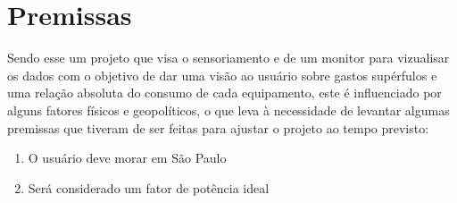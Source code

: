 \section{Premissas}

Sendo esse um projeto que visa o sensoriamento e de um monitor para vizualisar os dados com o objetivo de dar uma visão ao usuário sobre gastos supérfulos e uma relação absoluta do consumo de cada equipamento, este é influenciado por alguns fatores físicos e geopolíticos, o que leva à necessidade de levantar algumas premissas que tiveram de ser feitas para ajustar o projeto ao tempo previsto:

\begin{enumerate}
\item{O usuário deve morar em São Paulo}
\item{Será considerado um fator de potência ideal}
\end{enumerate}